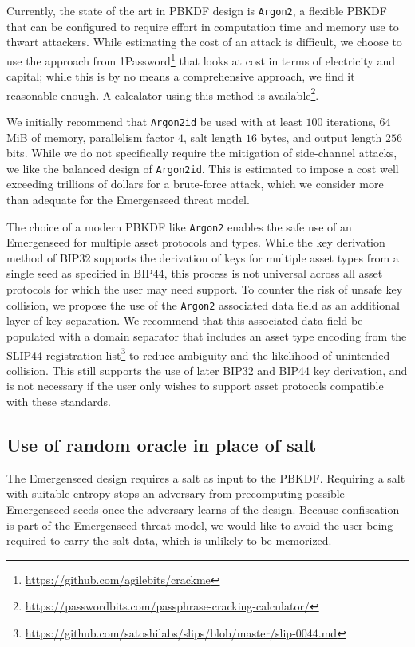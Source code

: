 \documentclass{article}
\begin{document}
Currently, the state of the art in PBKDF design is \texttt{Argon2}, a flexible PBKDF that can be configured to require effort in computation time and memory use to thwart attackers.
While estimating the cost of an attack is difficult, we choose to use the approach from 1Password\footnote{\url{https://github.com/agilebits/crackme}} that looks at cost in terms of electricity and capital; while this is by no means a comprehensive approach, we find it reasonable enough.
A calcalator using this method is available\footnote{\url{https://passwordbits.com/passphrase-cracking-calculator/}}.

We initially recommend that \texttt{Argon2id} be used with at least $100$ iterations, $64$ MiB of memory, parallelism factor $4$, salt length $16$ bytes, and output length $256$ bits.
While we do not specifically require the mitigation of side-channel attacks, we like the balanced design of \texttt{Argon2id}.
This is estimated to impose a cost well exceeding trillions of dollars for a brute-force attack, which we consider more than adequate for the Emergenseed threat model.

The choice of a modern PBKDF like \texttt{Argon2} enables the safe use of an Emergenseed for multiple asset protocols and types.
While the key derivation method of BIP32 supports the derivation of keys for multiple asset types from a single seed as specified in BIP44, this process is not universal across all asset protocols for which the user may need support.
To counter the risk of unsafe key collision, we propose the use of the \texttt{Argon2} associated data field as an additional layer of key separation.
We recommend that this associated data field be populated with a domain separator that includes an asset type encoding from the SLIP44 registration list\footnote{\url{https://github.com/satoshilabs/slips/blob/master/slip-0044.md}} to reduce ambiguity and the likelihood of unintended collision.
This still supports the use of later BIP32 and BIP44 key derivation, and is not necessary if the user only wishes to support asset protocols compatible with these standards.


\subsection{Use of random oracle in place of salt}

The Emergenseed design requires a salt as input to the PBKDF.
Requiring a salt with suitable entropy stops an adversary from precomputing possible Emergenseed seeds once the adversary learns of the design.
Because confiscation is part of the Emergenseed threat model, we would like to avoid the user being required to carry the salt data, which is unlikely to be memorized.
\end{document}
